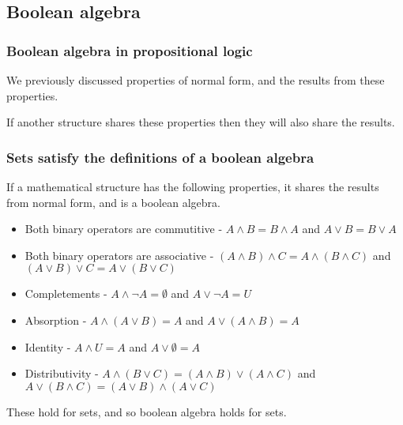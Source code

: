 
\subsection{Boolean algebra}

\subsubsection{Boolean algebra in propositional logic}

We previously discussed properties of normal form, and the results from these properties.

If another structure shares these properties then they will also share the results.

\subsubsection{Sets satisfy the definitions of a boolean algebra}

If a mathematical structure has the following properties, it shares the results from normal form, and is a boolean algebra.

\begin{itemize}
\item Both binary operators are commutitive - \(A\land B=B\land A\) and \(A\lor B=B\lor A\)
\item Both binary operators are associative - \((A\land B)\land C=A\land (B\land C)\) and \((A\lor B)\lor C=A\lor (B\lor C)\)
\item Completements - \(A\land \neg A=\emptyset \) and \(A\lor \neg A=U\)
\item Absorption - \(A\land (A\lor B)=A\) and \(A\lor (A\land B)=A\)
\item Identity - \(A\land U=A\) and \(A\lor \emptyset =A\)
\item Distributivity - \(A\land (B\lor C)=(A\land B)\lor (A\land C)\) and \(A\lor (B\land C)=(A\lor B)\land(A\lor C)\)
\end{itemize}

These hold for sets, and so boolean algebra holds for sets.

